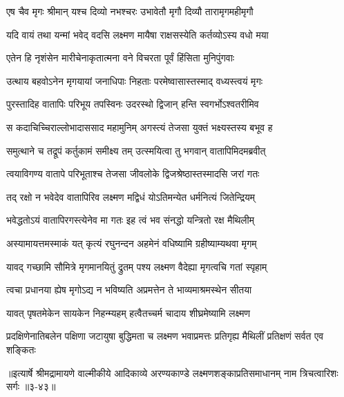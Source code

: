 \twolineshloka
{एष चैव मृगः श्रीमान् यश्च दिव्यो नभश्चरः}
{उभावेतौ मृगौ दिव्यौ तारामृगमहीमृगौ} %

\twolineshloka
{यदि वायं तथा यन्मां भवेद् वदसि लक्ष्मण}
{मायैषा राक्षसस्येति कर्तव्योऽस्य वधो मया} %

\twolineshloka
{एतेन हि नृशंसेन मारीचेनाकृतात्मना}
{वने विचरता पूर्वं हिंसिता मुनिपुंगवाः} %

\twolineshloka
{उत्थाय बहवोऽनेन मृगयायां जनाधिपाः}
{निहताः परमेष्वासास्तस्माद् वध्यस्त्वयं मृगः} %

\twolineshloka
{पुरस्तादिह वातापिः परिभूय तपस्विनः}
{उदरस्थो द्विजान् हन्ति स्वगर्भोऽश्वतरीमिव} %

\twolineshloka
{स कदाचिच्चिराल्लोभादाससाद महामुनिम्}
{अगस्त्यं तेजसा युक्तं भक्ष्यस्तस्य बभूव ह} %

\twolineshloka
{समुत्थाने च तद्रूपं कर्तुकामं समीक्ष्य तम्}
{उत्स्मयित्वा तु भगवान् वातापिमिदमब्रवीत्} %

\twolineshloka
{त्वयाविगण्य वातापे परिभूताश्च तेजसा}
{जीवलोके द्विजश्रेष्ठास्तस्मादसि जरां गतः} %

\twolineshloka
{तद् रक्षो न भवेदेव वातापिरिव लक्ष्मण}
{मद्विधं योऽतिमन्येत धर्मनित्यं जितेन्द्रियम्} %

\twolineshloka
{भवेद्धतोऽयं वातापिरगस्त्येनेव मा गतः}
{इह त्वं भव संनद्धो यन्त्रितो रक्ष मैथिलीम्} %

\twolineshloka
{अस्यामायत्तमस्माकं यत् कृत्यं रघुनन्दन}
{अहमेनं वधिष्यामि ग्रहीष्याम्यथवा मृगम्} %

\twolineshloka
{यावद् गच्छामि सौमित्रे मृगमानयितुं द्रुतम्}
{पश्य लक्ष्मण वैदेह्या मृगत्वचि गतां स्पृहाम्} %

\twolineshloka
{त्वचा प्रधानया ह्येष मृगोऽद्य न भविष्यति}
{अप्रमत्तेन ते भाव्यमाश्रमस्थेन सीतया} %

\twolineshloka
{यावत् पृषतमेकेन सायकेन निहन्म्यहम्}
{हत्वैतच्चर्म चादाय शीघ्रमेष्यामि लक्ष्मण} %

\twolineshloka
{प्रदक्षिणेनातिबलेन पक्षिणा जटायुषा बुद्धिमता च लक्ष्मण}
{भवाप्रमत्तः प्रतिगृह्य मैथिलीं प्रतिक्षणं सर्वत एव शङ्कितः} %


॥इत्यार्षे श्रीमद्रामायणे वाल्मीकीये आदिकाव्ये अरण्यकाण्डे लक्ष्मणशङ्काप्रतिसमाधानम् नाम त्रिचत्वारिशः सर्गः ॥३-४३॥
